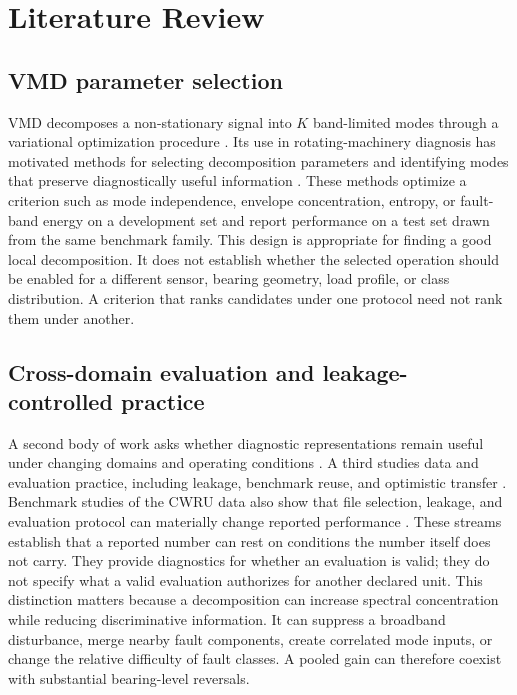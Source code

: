 \documentclass[11pt]{article}
\begin{document}
\section{Literature Review}

\subsection{VMD parameter selection}

VMD decomposes a non-stationary signal into $K$ band-limited modes through a
variational optimization procedure \citep{vmd_original}. Its use in
rotating-machinery diagnosis has motivated methods for selecting decomposition
parameters and identifying modes that preserve diagnostically useful
information
\citep{wang2015vmd,li2017independence,zheng2019dichotomy,jiang2021adaptive,
zhang2018adaptive,xu2023adaptive,ni2022fivmd,song2022selfadaptive}. These
methods optimize a criterion such as mode independence, envelope concentration,
entropy, or fault-band energy on a development set and report performance on a
test set drawn from the same benchmark family. This design is appropriate for
finding a good local decomposition. It does not establish whether the selected
operation should be enabled for a different sensor, bearing geometry, load
profile, or class distribution. A criterion that ranks candidates under one
protocol need not rank them under another.

\subsection{Cross-domain evaluation and leakage-controlled practice}

A second body of work asks whether diagnostic representations remain useful
under changing domains and operating conditions
\citep{cross_domain_review,hustbearing_2024}. A third studies data and
evaluation practice, including leakage, benchmark reuse, and optimistic
transfer \citep{vieira2026realistic}. Benchmark studies of the CWRU data also
show that file selection, leakage, and evaluation protocol can materially
change reported performance \citep{cwru_dataset,hendriks2022benchmark}. These streams establish that a reported
number can rest on conditions the number itself does not carry. They provide
diagnostics for whether an evaluation is valid; they do not specify what a
valid evaluation authorizes for another declared unit. This distinction matters
because a decomposition can increase spectral concentration while reducing
discriminative information. It can suppress a broadband disturbance, merge
nearby fault components, create correlated mode inputs, or change the relative
difficulty of fault classes. A pooled gain can therefore coexist with
substantial bearing-level reversals.
\end{document}
